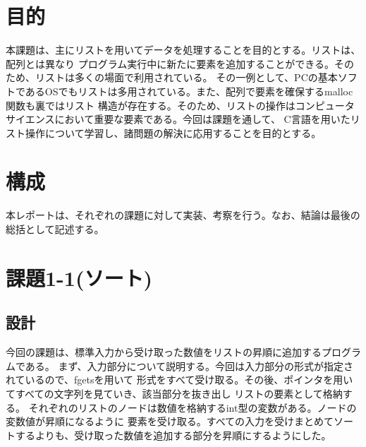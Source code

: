 \documentclass[a4j]{ltjsarticle}
\begin{document}
  \section{目的}
    本課題は、主にリストを用いてデータを処理することを目的とする。リストは、配列とは異なり
    プログラム実行中に新たに要素を追加することができる。そのため、リストは多くの場面で利用されている。
    その一例として、PCの基本ソフトであるOSでもリストは多用されている。また、配列で要素を確保するmalloc関数も裏ではリスト
    構造が存在する。そのため、リストの操作はコンピュータサイエンスにおいて重要な要素である。今回は課題を通して、
    C言語を用いたリスト操作について学習し、諸問題の解決に応用することを目的とする。
  \section{構成}
    本レポートは、それぞれの課題に対して実装、考察を行う。なお、結論は最後の総括として記述する。
  \section{課題1-1(ソート)}
    \subsection{設計}
      今回の課題は、標準入力から受け取った数値をリストの昇順に追加するプログラムである。
      まず、入力部分について説明する。今回は入力部分の形式が指定されているので、fgetsを用いて
      形式をすべて受け取る。その後、ポインタを用いてすべての文字列を見ていき、該当部分を抜き出し
      リストの要素として格納する。
      それぞれのリストのノードは数値を格納するint型の変数がある。ノードの変数値が昇順になるように
      要素を受け取る。すべての入力を受けまとめてソートするよりも、受け取った数値を追加する部分を昇順にするようにした。
      
\end{document}

